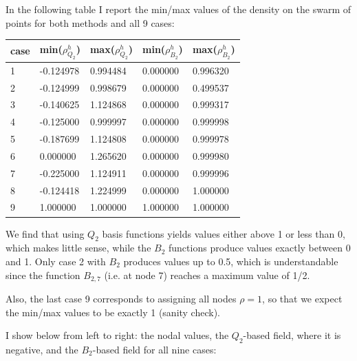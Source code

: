  
In the following table I report the min/max values of the density on the 
swarm of points for both methods and all 9 cases:

\begin{center}
\begin{tabular}{lllll}
\hline
case & min($\rho^h_{Q_2}$) & max($\rho^h_{Q_2}$)  & min($\rho^h_{B_2}$) & max($\rho^h_{B_2}$)  \\ 
\hline
\hline
1 &-0.124978 &0.994484 &0.000000 &0.996320  \\
2 &-0.124999 &0.998679 &0.000000 &0.499537  \\
3 &-0.140625 &1.124868 &0.000000 &0.999317  \\
4 &-0.125000 &0.999997 &0.000000 &0.999998  \\
5 &-0.187699 &1.124808 &0.000000 &0.999978  \\
6 & 0.000000 &1.265620 &0.000000 &0.999980  \\
7 &-0.225000 &1.124911 &0.000000 &0.999996  \\
8 &-0.124418 &1.224999 &0.000000 &1.000000  \\
9 & 1.000000 &1.000000 &1.000000 &1.000000  \\
\hline
\end{tabular}
\end{center}

We find that using $Q_2$ basis functions yields values 
either above 1 or less than 0, which makes little sense, 
while the $B_2$ functions produce values exactly between 0 and 1. 
Only case 2 with $B_2$ produces values up to 0.5, which is understandable 
since the function $B_{2,7}$ (i.e. at node 7) reaches a maximum value of 1/2.

Also, the last case 9 corresponds to assigning all nodes $\rho=1$,
so that we expect the min/max values to be exactly 1 (sanity check).

I show below from left to right: the nodal values, the $Q_2$-based field,
where it is negative, and the $B_2$-based field for all nine cases:

